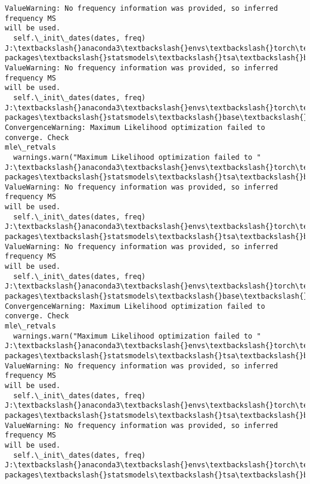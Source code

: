 \documentclass[11pt]{article}
\begin{document}
\begin{Verbatim}[commandchars=\\\{\}]
ValueWarning: No frequency information was provided, so inferred frequency MS
will be used.
  self.\_init\_dates(dates, freq)
J:\textbackslash{}anaconda3\textbackslash{}envs\textbackslash{}torch\textbackslash{}Lib\textbackslash{}site-packages\textbackslash{}statsmodels\textbackslash{}tsa\textbackslash{}base\textbackslash{}tsa\_model.py:473:
ValueWarning: No frequency information was provided, so inferred frequency MS
will be used.
  self.\_init\_dates(dates, freq)
J:\textbackslash{}anaconda3\textbackslash{}envs\textbackslash{}torch\textbackslash{}Lib\textbackslash{}site-packages\textbackslash{}statsmodels\textbackslash{}base\textbackslash{}model.py:607:
ConvergenceWarning: Maximum Likelihood optimization failed to converge. Check
mle\_retvals
  warnings.warn("Maximum Likelihood optimization failed to "
J:\textbackslash{}anaconda3\textbackslash{}envs\textbackslash{}torch\textbackslash{}Lib\textbackslash{}site-packages\textbackslash{}statsmodels\textbackslash{}tsa\textbackslash{}base\textbackslash{}tsa\_model.py:473:
ValueWarning: No frequency information was provided, so inferred frequency MS
will be used.
  self.\_init\_dates(dates, freq)
J:\textbackslash{}anaconda3\textbackslash{}envs\textbackslash{}torch\textbackslash{}Lib\textbackslash{}site-packages\textbackslash{}statsmodels\textbackslash{}tsa\textbackslash{}base\textbackslash{}tsa\_model.py:473:
ValueWarning: No frequency information was provided, so inferred frequency MS
will be used.
  self.\_init\_dates(dates, freq)
J:\textbackslash{}anaconda3\textbackslash{}envs\textbackslash{}torch\textbackslash{}Lib\textbackslash{}site-packages\textbackslash{}statsmodels\textbackslash{}base\textbackslash{}model.py:607:
ConvergenceWarning: Maximum Likelihood optimization failed to converge. Check
mle\_retvals
  warnings.warn("Maximum Likelihood optimization failed to "
J:\textbackslash{}anaconda3\textbackslash{}envs\textbackslash{}torch\textbackslash{}Lib\textbackslash{}site-packages\textbackslash{}statsmodels\textbackslash{}tsa\textbackslash{}base\textbackslash{}tsa\_model.py:473:
ValueWarning: No frequency information was provided, so inferred frequency MS
will be used.
  self.\_init\_dates(dates, freq)
J:\textbackslash{}anaconda3\textbackslash{}envs\textbackslash{}torch\textbackslash{}Lib\textbackslash{}site-packages\textbackslash{}statsmodels\textbackslash{}tsa\textbackslash{}base\textbackslash{}tsa\_model.py:473:
ValueWarning: No frequency information was provided, so inferred frequency MS
will be used.
  self.\_init\_dates(dates, freq)
J:\textbackslash{}anaconda3\textbackslash{}envs\textbackslash{}torch\textbackslash{}Lib\textbackslash{}site-packages\textbackslash{}statsmodels\textbackslash{}tsa\textbackslash{}base\textbackslash{}tsa\_model.py:473:

\end{Verbatim}
\end{document}
